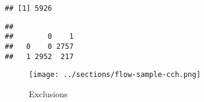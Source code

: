 \documentclass[
]{article}
\newenvironment{Shaded}{\begin{snugshade}}{\end{snugshade}}
\newcommand{\DataTypeTok}[1]{\textcolor[rgb]{0.13,0.29,0.53}{#1}}
\newcommand{\KeywordTok}[1]{\textcolor[rgb]{0.13,0.29,0.53}{\textbf{#1}}}
\newcommand{\NormalTok}[1]{#1}
\newcommand{\OperatorTok}[1]{\textcolor[rgb]{0.81,0.36,0.00}{\textbf{#1}}}
\newcommand{\StringTok}[1]{\textcolor[rgb]{0.31,0.60,0.02}{#1}}
\begin{document}
\begin{verbatim}
## [1] 5926
\end{verbatim}

\begin{Shaded}
\end{Shaded}

\begin{verbatim}
##    
##        0    1
##   0    0 2757
##   1 2952  217
\end{verbatim}

\begin{figure}
\centering
\texttt{[image: ../sections/flow-sample-cch.png]}
\caption{Exclusions}
\end{figure}
\end{document}
